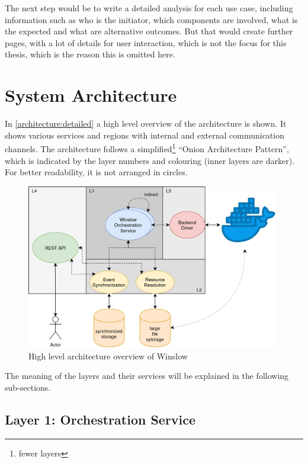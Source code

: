 The next step would be to write a detailed analysis for each use case, including information such as who is the initiator, which components are involved, what is the expected and what are alternative outcomes.
But that would create further pages, with a lot of details for user interaction, which is not the focus for this thesis, which is the reason this is omitted here.

\pagebreak
\section{System Architecture}

In \autoref{architecture:detailed} a high level overview of the architecture is shown.
It shows various services and regions with internal and external communication channels.
The architecture follows a simplified\footnote{fewer layers} \enquote{Onion Architecture Pattern}\cite{palermo:onion}, which is indicated by the layer numbers and colouring (inner layers are darker).
For better readability, it is not arranged in circles.



\begin{figure}[H]
	\includegraphics[width=0.99\textwidth]{architecture_detailed.png}
	\centering
	\caption{High level architecture overview of Winslow}
	\label{architecture:detailed}
\end{figure}

The meaning of the layers and their services will be explained in the following sub-sections.

\subsection{Layer 1: Orchestration Service}
\label{analysis:layer_1}

